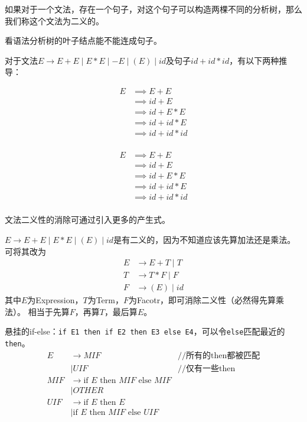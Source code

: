 \begin{definition}[二义性]
如果对于一个文法，存在一个句子，对这个句子可以构造两棵不同的分析树，那么我们称这个文法为二义的。
\end{definition}
看语法分析树的叶子结点能不能连成句子。

\begin{example}
对于文法$E\to E+E\mid E*E\mid -E\mid (E)\mid id$及句子$id+id*id$，有以下两种推导：

\begin{minipage}{0.5\linewidth}
\[\begin{aligned}
E &\implies E+E\\
&\implies id+E\\
&\implies id+E*E\\
&\implies id+id*E\\
&\implies id+id*id\\
\end{aligned}\]
\end{minipage}
\begin{minipage}{0.5\linewidth}
\[\begin{aligned}
E &\implies E+E\\
&\implies id+E\\
&\implies id+E*E\\
&\implies id+id*E\\
&\implies id+id*id\\
\end{aligned}\]
\end{minipage}
\end{example}

文法二义性的消除可通过引入更多的产生式。
\begin{example}
$E\to E+E\mid E*E\mid (E)\mid id$是有二义的，因为不知道应该先算加法还是乘法。
可将其改为
\[\begin{aligned}
E &\to E+T\mid T\\
T &\to T*F\mid F\\
F &\to (E)\mid id
\end{aligned}\]
其中$E$为Expression，$T$为Term，$F$为Facotr，即可消除二义性（必然得先算乘法）。
相当于先算$F$，再算$T$，最后算$E$。
\end{example}
\begin{example}
悬挂的if-else：\verb'if E1 then if E2 then E3 else E4'，可以令\verb'else'匹配最近的\verb'then'。
\[\begin{array}{rll}
E &\to MIF &\text{//所有的then都被匹配}\\
  &\mid UIF &\text{//仅有一些then}\\
MIF &\to \text{if } E \text{ then } MIF \text{ else } MIF &\\
  &\mid OTHER &\\
UIF &\to \text{if } E \text{ then } E &\\
  &\mid \text{if } E \text{ then } MIF \text{ else } UIF &
\end{array}\]
\end{example}

